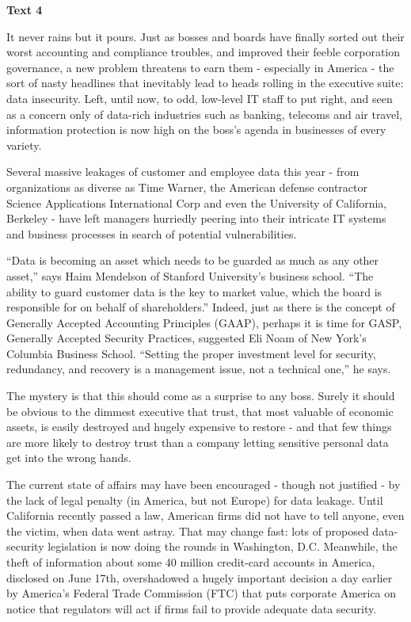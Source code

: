 \begin{center}\textbf{Text 4}\end{center}

\qquad It never rains but it pours. Just as bosses and boards have finally sorted out their worst accounting and compliance troubles, and improved their feeble corporation governance, a new problem threatens to earn them - especially in America - the sort of nasty headlines that inevitably lead to heads rolling in the executive suite: data insecurity. Left, until now, to odd, low-level IT staff to put right, and seen as a concern only of data-rich industries such as banking, telecoms and air travel, information protection is now high on the boss’s agenda in businesses of every variety.

\qquad Several massive leakages of customer and employee data this year - from organizations as diverse as Time Warner, the American defense contractor Science Applications International Corp and even the University of California, Berkeley - have left managers hurriedly peering into their intricate IT systems and business processes in search of potential vulnerabilities.

\qquad “Data is becoming an asset which needs to be guarded as much as any other asset,” says Haim Mendelson of Stanford University’s business school. “The ability to guard customer data is the key to market value, which the board is responsible for on behalf of shareholders.” Indeed, just as there is the concept of Generally Accepted Accounting Principles (GAAP), perhaps it is time for GASP, Generally Accepted Security Practices, suggested Eli Noam of New York’s Columbia Business School. “Setting the proper investment level for security, redundancy, and recovery is a management issue, not a technical one,” he says.

\qquad The mystery is that this should come as a surprise to any boss. Surely it should be obvious to the dimmest executive that trust, that most valuable of economic assets, is easily destroyed and hugely expensive to restore - and that few things are more likely to destroy trust than a company letting sensitive personal data get into the wrong hands.

\qquad The current state of affairs may have been encouraged - though not justified - by the lack of legal penalty (in America, but not Europe) for data leakage. Until California recently passed a law, American firms did not have to tell anyone, even the victim, when data went astray. That may change fast: lots of proposed data-security legislation is now doing the rounds in Washington, D.C. Meanwhile, the theft of information about some 40 million credit-card accounts in America, disclosed on June 17th, overshadowed a hugely important decision a day earlier by America’s Federal Trade Commission (FTC) that puts corporate America on notice that regulators will act if firms fail to provide adequate data security.

